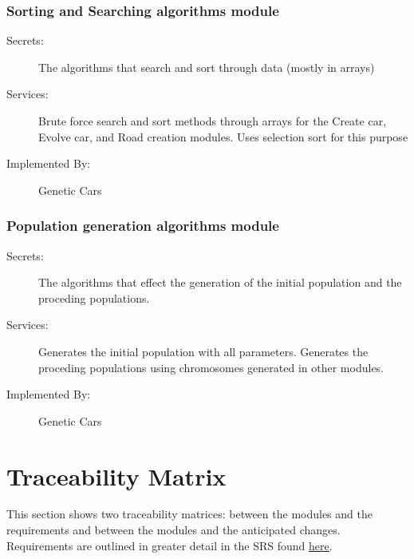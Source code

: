 \documentclass[12pt, titlepage]{article}
\begin{document}
\subsubsection{Sorting and Searching algorithms module}

\begin{description}
\item[Secrets:] The algorithms that search and sort through data (mostly in arrays)
\item[Services:] Brute force search and sort methods through arrays for the Create car, Evolve car, and Road creation modules. Uses selection sort for this purpose
\item[Implemented By:] Genetic Cars
\end{description}

\subsubsection{Population generation algorithms module}

\begin{description}
\item[Secrets:] The algorithms that effect the generation of the initial population and the proceding populations.
\item[Services:] Generates the initial population with all parameters. Generates the proceding populations using chromosomes generated in other modules.
\item[Implemented By:] Genetic Cars
\end{description}

\section{Traceability Matrix} \label{SecTM}

This section shows two traceability matrices: between the modules and the
requirements and between the modules and the anticipated changes. Requirements are outlined in greater detail in the SRS found \href{https://gitlab.cas.mcmaster.ca/linkk4/GrateBox/tree/master/Doc/SRS}{here}.
\end{document}
